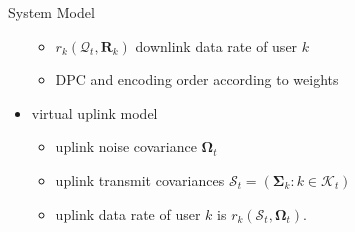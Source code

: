\documentclass[a0,2col,print,fontscale=1.3]{msvposter}
\newcommand{\B}[1]{\boldsymbol{#1}}
\newcommand{\setof}[1]{\mathcal{#1}}
\begin{document}
\begin{poster}
\begin{postercolumn}
\begin{posterbox}{System Model}
\begin{itemize}
\begin{itemize}
  \item $r_k(\setof{Q}_t,\B R_k)$ downlink data rate of user $k$
  \item DPC and encoding order according to weights
\end{itemize}
\item virtual uplink model
\begin{itemize}
 \item uplink noise covariance $\B \Omega_t$ 
 \item uplink transmit covariances $\setof{S}_t = \left(\B \Sigma_{k} : k \in \setof{K}_t\right)$
 \item uplink data rate of user $k$ is $r_k(\setof{S}_t,\B \Omega_t)$. 
\end{itemize}

\end{itemize}
 

\end{posterbox}


\end{postercolumn}
\end{poster}
\end{document}
